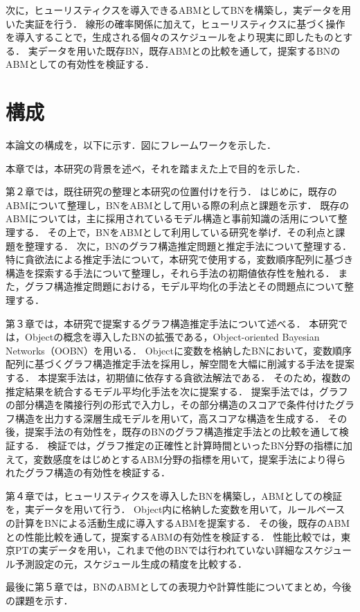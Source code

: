 次に，ヒューリスティクスを導入できるABMとしてBNを構築し，実データを用いた実証を行う．
線形の確率関係に加えて，ヒューリスティクスに基づく操作を導入することで，生成される個々のスケジュールをより現実に即したものとする．
実データを用いた既存BN，既存ABMとの比較を通して，提案するBNのABMとしての有効性を検証する．

\section{構成}\label{1.3}
本論文の構成を，以下に示す．図にフレームワークを示した．

本章では，本研究の背景を述べ，それを踏まえた上で目的を示した．

第２章では，既往研究の整理と本研究の位置付けを行う．
はじめに，既存のABMについて整理し，BNをABMとして用いる際の利点と課題を示す．
既存のABMについては，主に採用されているモデル構造と事前知識の活用について整理する．
その上で，BNをABMとして利用している研究を挙げ．その利点と課題を整理する．
次に，BNのグラフ構造推定問題と推定手法について整理する．
特に貪欲法による推定手法について，本研究で使用する，変数順序配列に基づき構造を探索する手法について整理し，それら手法の初期値依存性を触れる．
また，グラフ構造推定問題における，モデル平均化の手法とその問題点について整理する．

第３章では，本研究で提案するグラフ構造推定手法について述べる．
本研究では，Objectの概念を導入したBNの拡張である，Object-oriented Bayesian Networks（OOBN）を用いる．
Objectに変数を格納したBNにおいて，変数順序配列に基づくグラフ構造推定手法を採用し，解空間を大幅に削減する手法を提案する．
本提案手法は，初期値に依存する貪欲法解法である．
そのため，複数の推定結果を統合するモデル平均化手法を次に提案する．
提案手法では，グラフの部分構造を隣接行列の形式で入力し，その部分構造のスコアで条件付けたグラフ構造を出力する深層生成モデルを用いて，高スコアな構造を生成する．
その後，提案手法の有効性を，既存のBNのグラフ構造推定手法との比較を通して検証する．
検証では，グラフ推定の正確性と計算時間といったBN分野の指標に加えて，変数感度をはじめとするABM分野の指標を用いて，提案手法により得られたグラフ構造の有効性を検証する．

第４章では，ヒューリスティクスを導入したBNを構築し，ABMとしての検証を，実データを用いて行う．
Object内に格納した変数を用いて，ルールベースの計算をBNによる活動生成に導入するABMを提案する．
その後，既存のABMとの性能比較を通して，提案するABMの有効性を検証する．
性能比較では，東京PTの実データを用い，これまで他のBNでは行われていない詳細なスケジュール予測設定の元，スケジュール生成の精度を比較する．

最後に第５章では，BNのABMとしての表現力や計算性能についてまとめ，今後の課題を示す．